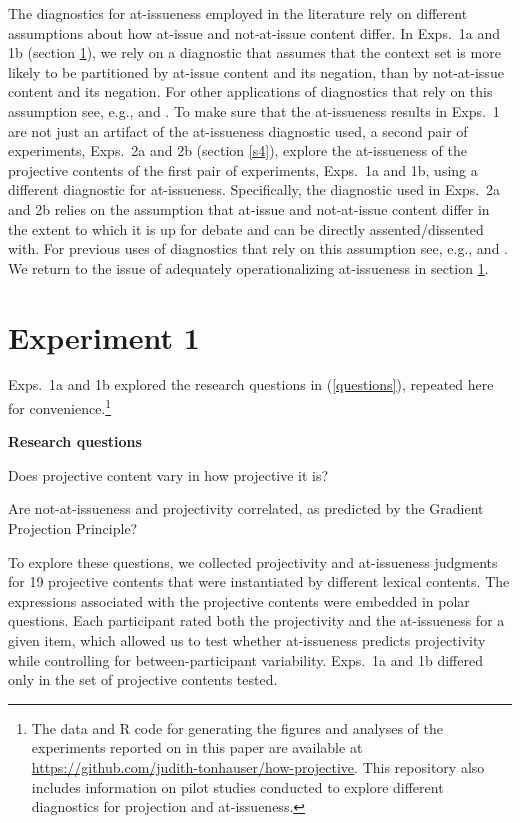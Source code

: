 \documentclass[11pt,fleqn]{article}
\newcommand{\6}{\mbox{$[\hspace*{-.6mm}[$}}
\newcommand{\9}{\mbox{$]\hspace*{-.6mm}]$}}
\begin{document}
The diagnostics for at-issueness employed in the literature rely on different assumptions about how at-issue and not-at-issue content differ. In Exps.~1a and 1b (section \ref{s3}), we rely on a diagnostic that assumes that the context set is more likely to be partitioned by at-issue content and its negation, than by not-at-issue content and its negation. For other applications of diagnostics that rely on this assumption see, e.g., \citealt{amaral-etal07} and \citealt{tonhauser-sula6}. To make sure that the at-issueness results in Exps.~1 are not just an artifact of the at-issueness diagnostic used, a second pair of experiments, Exps.~2a and 2b (section \ref{s4}), explore the at-issueness of the projective contents of the first pair of experiments, Exps.~1a and 1b, using a different diagnostic for at-issueness. Specifically, the diagnostic used in Exps.~2a and 2b relies on the assumption that at-issue and not-at-issue content differ in the extent to which it is up for debate and can be directly assented/dissented with. For previous uses of diagnostics that rely on this assumption see, e.g., \citealt{amaral-etal07,xue-onea11,murray2014,anderbois-etal2015,destruel-etal2015,tonhauser-sula6} and \citealt{syrett-koev2015}. We return to the issue of adequately operationalizing at-issueness in section \ref{s3}.

\section{Experiment 1}
\label{s3}

Exps.~1a and 1b explored the research questions in (\ref{questions}), repeated here for convenience.\footnote{\label{f-github}The
data and R code for generating the figures and analyses
of the experiments reported on in this paper are available at \url{https://github.com/judith-tonhauser/how-projective}. This repository also includes information on pilot studies conducted to explore different diagnostics for projection and at-issueness.}

\begin{exe}
\exi{(\ref{questions})} {\bf Research questions}

\begin{xlist} 

\ex Does projective content vary in how projective it is?

Are not-at-issueness and projectivity correlated, as predicted by the Gradient Projection Principle?

\end{xlist}

\end{exe} 
To explore these questions, we collected projectivity and at-issueness judgments for 19  projective contents that were instantiated by different lexical contents. The expressions associated with the projective contents were embedded in polar questions. Each participant rated both the projectivity and the at-issueness for a given item, which allowed us to test whether at-issueness predicts projectivity while controlling for between-participant variability. Exps.~1a and 1b differed only in the set of projective contents tested. 
\end{document}
